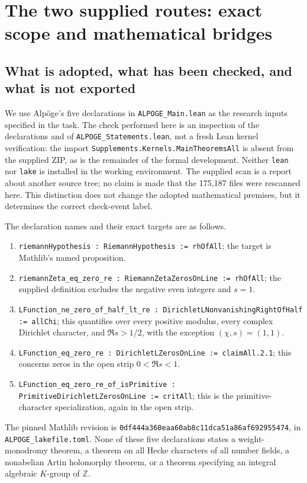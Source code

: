 \documentclass[11pt,a4paper]{article}
\theoremstyle{definition}\newtheorem{definition}[theorem]{Definition}
\theoremstyle{remark}\newtheorem{remark}[theorem]{Remark}
\begin{document}

\section{The two supplied routes: exact scope and mathematical bridges}
\label{sec:source-masullo}

\subsection{What is adopted, what has been checked, and what is not exported}

We use Alp\"oge's five declarations in \nolinkurl{ALPOGE_Main.lean} as the research
inputs specified in the task.  The check performed here is an inspection of the
declarations and of \nolinkurl{ALPOGE_Statements.lean}, not a fresh Lean kernel
verification: the import \nolinkurl{Supplements.Kernels.MainTheoremsAll} is absent
from the supplied ZIP, as is the remainder of the formal development.  Neither
\nolinkurl{lean} nor \nolinkurl{lake} is installed in the working environment.  The
supplied scan is a report about another source tree; no claim is made that the
175,187 files were rescanned here.  This distinction does not change the adopted
mathematical premises, but it determines the correct check-event label.

The declaration names and their exact targets are as follows.
\begin{enumerate}
\item \texttt{riemannHypothesis : RiemannHypothesis := rhOfAll}; the target is
Mathlib's named proposition.
\item \texttt{riemannZeta\_eq\_zero\_re : RiemannZetaZerosOnLine := rhOfAll};
the supplied definition excludes the negative even integers and $s=1$.
\item \texttt{LFunction\_ne\_zero\_of\_half\_lt\_re :
DirichletLNonvanishingRightOfHalf := allChi}; this quantifies over every positive
modulus, every complex Dirichlet character, and $\Re s>1/2$, with the exception
$(\chi,s)=(1,1)$.
\item \texttt{LFunction\_eq\_zero\_re : DirichletLZerosOnLine := claimAll.2.1};
this concerns zeros in the open strip $0<\Re s<1$.
\item \texttt{LFunction\_eq\_zero\_re\_of\_isPrimitive :
PrimitiveDirichletLZerosOnLine := critAll}; this is the primitive-character
specialization, again in the open strip.
\end{enumerate}
The pinned Mathlib revision is
\nolinkurl{0df444a360eaa60ab8c11dca51a86af692955474}, in
\nolinkurl{ALPOGE_lakefile.toml}.  None of these five declarations states a
weight-monodromy theorem, a theorem on all Hecke characters of all number
fields, a nonabelian Artin holomorphy theorem, or a theorem specifying an
integral algebraic $K$-group of $\mathbb Z$.
\end{document}
